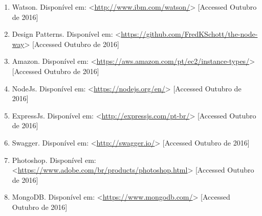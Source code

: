 \begin{enumerate}
\item \label{watson} Watson. Disponível em: <\url{http://www.ibm.com/watson/}> [Accessed Outubro de 2016]

\item \label{designpat} Design Patterns. Disponível em: <\url{https://github.com/FredKSchott/the-node-way}> [Accessed Outubro de 2016]

\item \label{amazon} Amazon. Disponível em: <\url{https://aws.amazon.com/pt/ec2/instance-types/}> [Accessed Outubro de 2016]

\item \label{nodejs} NodeJs. Disponível em: <\url{https://nodejs.org/en/}> [Accessed Outubro de 2016]

\item \label{express} ExpressJs. Disponível em: <\url{http://expressjs.com/pt-br/}> [Accessed Outubro de 2016]

\item \label{swagger} Swagger. Disponível em: <\url{http://swagger.io/}> [Accessed Outubro de 2016]

\item \label{ps} Photoshop. Disponível em: <\url{https://www.adobe.com/br/products/photoshop.html}> [Accessed Outubro de 2016]

\item \label{mongodb} MongoDB. Disponível em: <\url{https://www.mongodb.com/}> [Accessed Outubro de 2016]

\end{enumerate}



